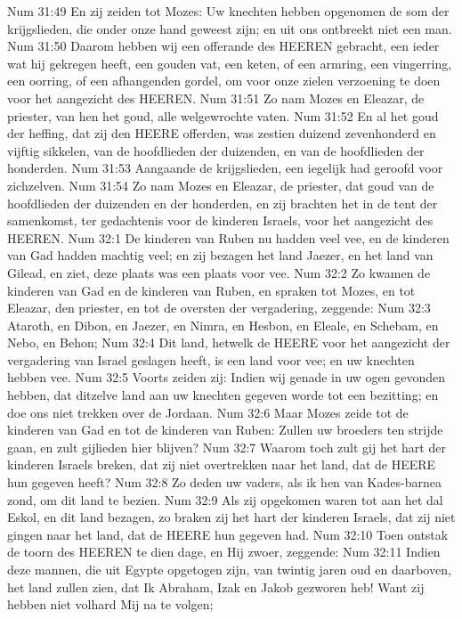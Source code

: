 Num 31:49  En zij zeiden tot Mozes: Uw knechten hebben opgenomen de som der krijgslieden, die onder onze hand geweest zijn; en uit ons ontbreekt niet een man.
Num 31:50  Daarom hebben wij een offerande des HEEREN gebracht, een ieder wat hij gekregen heeft, een gouden vat, een keten, of een armring, een vingerring, een oorring, of een afhangenden gordel, om voor onze zielen verzoening te doen voor het aangezicht des HEEREN.
Num 31:51  Zo nam Mozes en Eleazar, de priester, van hen het goud, alle welgewrochte vaten.
Num 31:52  En al het goud der heffing, dat zij den HEERE offerden, was zestien duizend zevenhonderd en vijftig sikkelen, van de hoofdlieden der duizenden, en van de hoofdlieden der honderden.
Num 31:53  Aangaande de krijgslieden, een iegelijk had geroofd voor zichzelven.
Num 31:54  Zo nam Mozes en Eleazar, de priester, dat goud van de hoofdlieden der duizenden en der honderden, en zij brachten het in de tent der samenkomst, ter gedachtenis voor de kinderen Israels, voor het aangezicht des HEEREN.
Num 32:1  De kinderen van Ruben nu hadden veel vee, en de kinderen van Gad hadden machtig veel; en zij bezagen het land Jaezer, en het land van Gilead, en ziet, deze plaats was een plaats voor vee.
Num 32:2  Zo kwamen de kinderen van Gad en de kinderen van Ruben, en spraken tot Mozes, en tot Eleazar, den priester, en tot de oversten der vergadering, zeggende:
Num 32:3  Ataroth, en Dibon, en Jaezer, en Nimra, en Hesbon, en Eleale, en Schebam, en Nebo, en Behon;
Num 32:4  Dit land, hetwelk de HEERE voor het aangezicht der vergadering van Israel geslagen heeft, is een land voor vee; en uw knechten hebben vee.
Num 32:5  Voorts zeiden zij: Indien wij genade in uw ogen gevonden hebben, dat ditzelve land aan uw knechten gegeven worde tot een bezitting; en doe ons niet trekken over de Jordaan.
Num 32:6  Maar Mozes zeide tot de kinderen van Gad en tot de kinderen van Ruben: Zullen uw broeders ten strijde gaan, en zult gijlieden hier blijven?
Num 32:7  Waarom toch zult gij het hart der kinderen Israels breken, dat zij niet overtrekken naar het land, dat de HEERE hun gegeven heeft?
Num 32:8  Zo deden uw vaders, als ik hen van Kades-barnea zond, om dit land te bezien.
Num 32:9  Als zij opgekomen waren tot aan het dal Eskol, en dit land bezagen, zo braken zij het hart der kinderen Israels, dat zij niet gingen naar het land, dat de HEERE hun gegeven had.
Num 32:10  Toen ontstak de toorn des HEEREN te dien dage, en Hij zwoer, zeggende:
Num 32:11  Indien deze mannen, die uit Egypte opgetogen zijn, van twintig jaren oud en daarboven, het land zullen zien, dat Ik Abraham, Izak en Jakob gezworen heb! Want zij hebben niet volhard Mij na te volgen;
